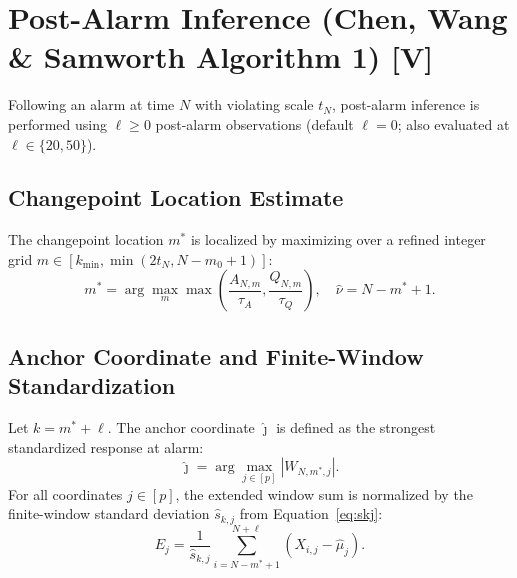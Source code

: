 \documentclass[11pt]{article}
\begin{document}
\section{Post-Alarm Inference (Chen, Wang \& Samworth Algorithm 1) [V]}
Following an alarm at time $N$ with violating scale $t_N$, post-alarm inference is performed using $\ell \ge 0$ post-alarm observations (default $\ell = 0$; also evaluated at $\ell \in \{20, 50\}$).

\subsection{Changepoint Location Estimate}
The changepoint location $m^*$ is localized by maximizing over a refined integer grid $m \in [k_{\min}, \min(2t_N, N - m_0 + 1)]$:
\begin{equation}
    m^* = \arg\max_{m} \max\left( \frac{A_{N,m}}{\tau_A}, \frac{Q_{N,m}}{\tau_Q} \right), \quad \hat{\nu} = N - m^* + 1. \label{eq:mstar}
\end{equation}

\subsection{Anchor Coordinate and Finite-Window Standardization}
Let $k = m^* + \ell$. The anchor coordinate $\hat{\jmath}$ is defined as the strongest standardized response at alarm:
\begin{equation}
    \hat{\jmath} = \arg\max_{j \in [p]} |W_{N, m^*, j}|. \label{eq:anchor}
\end{equation}
For all coordinates $j \in [p]$, the extended window sum is normalized by the finite-window standard deviation $\hat{s}_{k,j}$ from Equation~\eqref{eq:skj}:
\begin{equation}
    E_j = \frac{1}{\hat{s}_{k,j}} \sum_{i = N - m^* + 1}^{N + \ell} (X_{i,j} - \hat{\mu}_j). \label{eq:Ej}
\end{equation}
\end{document}
